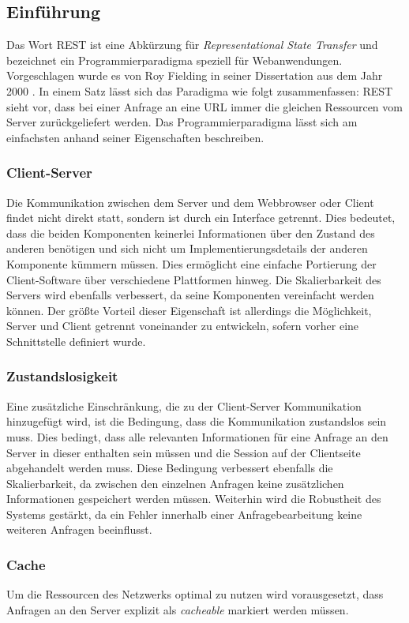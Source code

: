 \subsection{Einführung}
\label{resteinfuehrung}
Das Wort REST ist eine Abkürzung für \textit{Representational State Transfer} und bezeichnet ein Programmierparadigma speziell für Webanwendungen. Vorgeschlagen wurde es von Roy Fielding in seiner Dissertation aus dem Jahr 2000 \cite{fielding}. In einem Satz lässt sich das Paradigma wie folgt zusammenfassen: REST sieht vor, dass bei einer Anfrage an eine URL immer die gleichen Ressourcen vom Server zurückgeliefert werden. Das Programmierparadigma lässt sich am einfachsten anhand seiner Eigenschaften beschreiben.

\subsubsection{Client-Server}
Die Kommunikation zwischen dem Server und dem Webbrowser oder Client findet nicht direkt statt, sondern ist durch ein Interface getrennt. Dies bedeutet, dass die beiden Komponenten keinerlei Informationen über den Zustand des anderen benötigen und sich nicht um Implementierungsdetails der anderen Komponente kümmern müssen. Dies ermöglicht eine einfache Portierung der Client-Software über verschiedene Plattformen hinweg. Die Skalierbarkeit des Servers wird ebenfalls verbessert, da seine Komponenten vereinfacht werden können. Der größte Vorteil dieser Eigenschaft ist allerdings die Möglichkeit, Server und Client getrennt voneinander zu entwickeln, sofern vorher eine Schnittstelle definiert wurde.

\subsubsection{Zustandslosigkeit}
Eine zusätzliche Einschränkung, die zu der Client-Server Kommunikation hinzugefügt wird, ist die Bedingung, dass die Kommunikation zustandslos sein muss. Dies bedingt, dass alle relevanten Informationen für eine Anfrage an den Server in dieser enthalten sein müssen und die Session auf der Clientseite abgehandelt werden muss. Diese Bedingung verbessert ebenfalls die Skalierbarkeit, da zwischen den einzelnen Anfragen keine zusätzlichen Informationen gespeichert werden müssen. Weiterhin wird die Robustheit des Systems gestärkt, da ein Fehler innerhalb einer Anfragebearbeitung keine weiteren Anfragen beeinflusst.

\subsubsection{Cache}
Um die Ressourcen des Netzwerks optimal zu nutzen wird vorausgesetzt, dass Anfragen an den Server explizit als \textit{cacheable} markiert werden müssen. 

